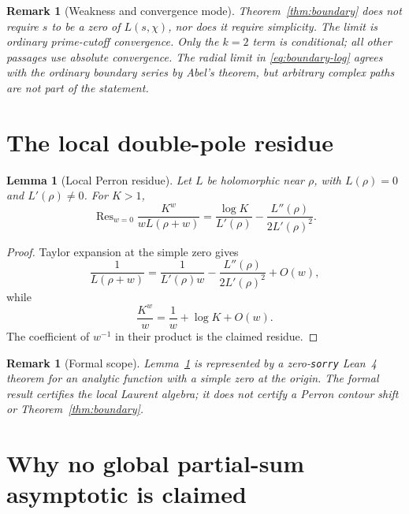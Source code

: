 \documentclass[11pt]{article}
\newtheorem{lemma}[theorem]{Lemma}
\newtheorem{remark}[theorem]{Remark}
\DeclareMathOperator{\Residue}{Res}
\begin{document}
\begin{remark}[Weakness and convergence mode]
Theorem~\ref{thm:boundary} does not require $s$ to be a zero of
$L(s,\chi)$, nor does it require simplicity.  The limit is ordinary
prime-cutoff convergence.  Only the $k=2$ term is conditional; all other
passages use absolute convergence.  The radial limit in
\eqref{eq:boundary-log} agrees with the ordinary boundary series by Abel's
theorem, but arbitrary complex paths are not part of the statement.
\end{remark}

\section{The local double-pole residue}

\begin{lemma}[Local Perron residue]\label{lem:local-residue}
Let $L$ be holomorphic near $\rho$, with $L(\rho)=0$ and
$L'(\rho)\ne0$.  For $K>1$,
\begin{equation}
 \Residue_{w=0}\frac{K^w}{wL(\rho+w)}
 =\frac{\log K}{L'(\rho)}-
   \frac{L''(\rho)}{2L'(\rho)^2}.
\end{equation}
\end{lemma}

\begin{proof}
Taylor expansion at the simple zero gives
\[
 \frac1{L(\rho+w)}
 =\frac1{L'(\rho)w}-\frac{L''(\rho)}{2L'(\rho)^2}+O(w),
\]
while
\[
 \frac{K^w}{w}=\frac1w+\log K+O(w).
\]
The coefficient of $w^{-1}$ in their product is the claimed residue.
\end{proof}

\begin{remark}[Formal scope]
Lemma~\ref{lem:local-residue} is represented by a zero-\texttt{sorry} Lean~4
theorem for an analytic function with a simple zero at the origin.  The formal
result certifies the local Laurent algebra; it does not certify a Perron
contour shift or Theorem~\ref{thm:boundary}.
\end{remark}

\section{Why no global partial-sum asymptotic is claimed}
\end{document}
